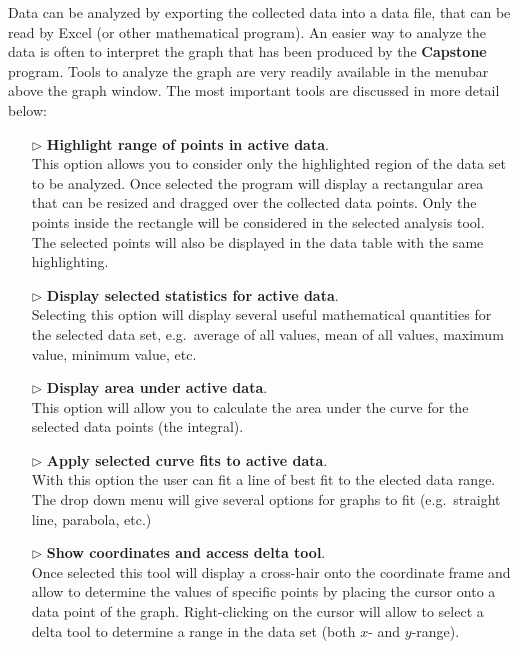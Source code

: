 Data can be analyzed by exporting the collected data into a data file, that can be read by  Excel (or other mathematical program). An easier way to analyze the data is often to interpret the graph that has been produced by the \textbf{Capstone} program. Tools to analyze the graph are very readily available in the menubar above the graph window. The most important tools are discussed in more detail below:
\begin{itemize}
\item[\(\triangleright\)] \textbf{Highlight range of points in active data}.\\
This option allows you to consider only the highlighted region of the data set to be analyzed. Once selected the program will display a rectangular area that can be resized and dragged over the collected data points. Only the points inside the rectangle will be considered in the selected analysis tool. The selected points will also be displayed in the data table with the same highlighting.
\item[\(\triangleright\)] \textbf{Display selected statistics for active data}.\\
Selecting this option will display several useful mathematical quantities for the selected data set, e.g.\ average of all values, mean of all values, maximum value, minimum value, etc.
\item[\(\triangleright\)] \textbf{Display area under active data}.\\
This option will allow you to calculate the area under the curve for the selected data points (the integral).
\item[\(\triangleright\)] \textbf{Apply selected curve fits to active data}.\\
With this option the user can fit a line of best fit to the elected data range. The drop down menu will give several options for graphs to fit (e.g.\ straight line, parabola, etc.)
\item[\(\triangleright\)] \textbf{Show coordinates and access delta tool}.\\
Once selected this tool will display a cross-hair onto the coordinate frame and allow to determine the values of specific points by placing the cursor onto a data point of the graph. Right-clicking on the cursor will allow to select a delta tool to determine a range in the data set (both $x$- and $y$-range).
\end{itemize}
